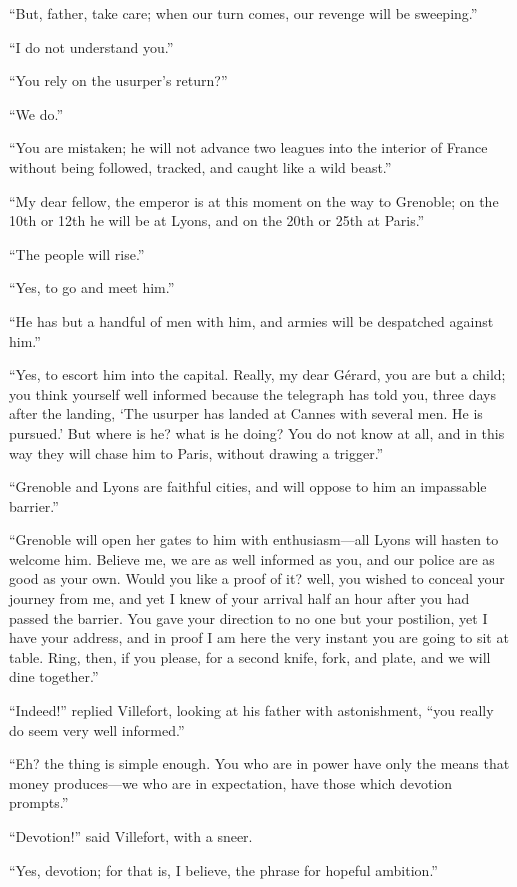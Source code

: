 “But, father, take care; when our turn comes, our revenge will be
sweeping.”

“I do not understand you.”

“You rely on the usurper’s return?”

“We do.”

“You are mistaken; he will not advance two leagues into the interior of
France without being followed, tracked, and caught like a wild beast.”

“My dear fellow, the emperor is at this moment on the way to Grenoble;
on the 10th or 12th he will be at Lyons, and on the 20th or 25th at
Paris.”

“The people will rise.”

“Yes, to go and meet him.”

“He has but a handful of men with him, and armies will be despatched
against him.”

“Yes, to escort him into the capital. Really, my dear Gérard, you are
but a child; you think yourself well informed because the telegraph has
told you, three days after the landing, ‘The usurper has landed at
Cannes with several men. He is pursued.’ But where is he? what is he
doing? You do not know at all, and in this way they will chase him to
Paris, without drawing a trigger.”

“Grenoble and Lyons are faithful cities, and will oppose to him an
impassable barrier.”

“Grenoble will open her gates to him with enthusiasm—all Lyons will
hasten to welcome him. Believe me, we are as well informed as you, and
our police are as good as your own. Would you like a proof of it? well,
you wished to conceal your journey from me, and yet I knew of your
arrival half an hour after you had passed the barrier. You gave your
direction to no one but your postilion, yet I have your address, and in
proof I am here the very instant you are going to sit at table. Ring,
then, if you please, for a second knife, fork, and plate, and we will
dine together.”

“Indeed!” replied Villefort, looking at his father with astonishment,
“you really do seem very well informed.”

“Eh? the thing is simple enough. You who are in power have only the
means that money produces—we who are in expectation, have those which
devotion prompts.”

“Devotion!” said Villefort, with a sneer.

“Yes, devotion; for that is, I believe, the phrase for hopeful
ambition.”


